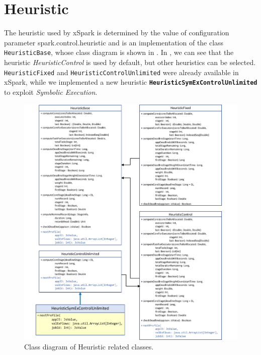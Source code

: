 \section{Heuristic}\label{sec:impl_heuristic}
The heuristic used by xSpark is determined by the value of configuration parameter spark.control.heuristic and is an implementation of the class \texttt{HeuristicBase}, whose class diagram is shown in . In  , we can see that the heuristic \textit{HeuristicControl} is used by default, but other heuristics can be selected. \texttt{HeuristicFixed} and \texttt{HeuristicControlUnlimited} were already available in xSpark, while we implemented a new heuristic \textbf{\texttt{HeuristicSymExControlUnlimited}} to exploit \textit{Symbolic Execution}.

\begin{figure}[tbhp]
	\hspace*{-4cm}
	\centering
	\includegraphics[width=20cm]{images/heuristic_class_diagram}
	\caption{Class diagram of Heuristic related classes.}
	\label{fig:heuristic_class_diagram}
\end{figure}
